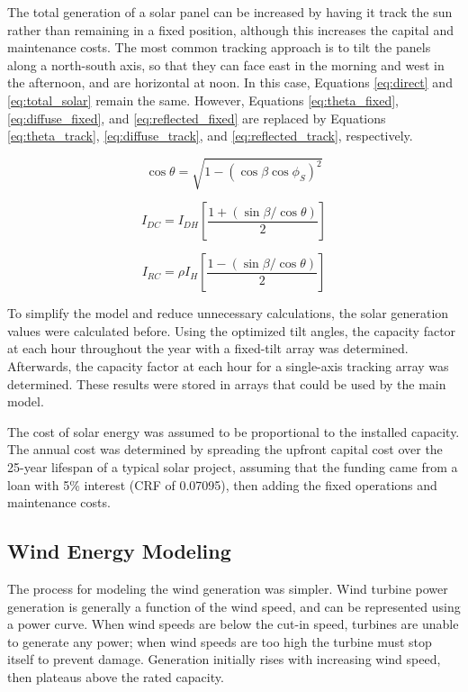 \documentclass{article}
\begin{document}
The total generation of a solar panel can be increased by having it track the sun rather than remaining in a fixed position, although this increases the capital and maintenance costs.  The most common tracking approach is to tilt the panels along a north-south axis, so that they can face east in the morning and west in the afternoon, and are horizontal at noon.  In this case, Equations \ref{eq:direct} and \ref{eq:total_solar} remain the same.  However, Equations \ref{eq:theta_fixed}, \ref{eq:diffuse_fixed}, and \ref{eq:reflected_fixed} are replaced by Equations \ref{eq:theta_track}, \ref{eq:diffuse_track}, and \ref{eq:reflected_track}, respectively.

\begin{equation}
\cos \theta = \sqrt{1 - \left(\cos\beta\cos\phi_S \right)^2}
\label{eq:theta_track}
\end{equation}

\begin{equation}
I_{\mathit{DC}} = I_{\mathit{DH}} \left[\frac{1 + \left(\sin \beta / \cos \theta\right)}{2}\right]
\label{eq:diffuse_track}
\end{equation}

\begin{equation}
I_{\mathit{RC}} = \rho I_H \left[\frac{1 - \left(\sin \beta / \cos \theta\right)}{2}\right]
\label{eq:reflected_track}
\end{equation}

To simplify the model and reduce unnecessary calculations, the solar generation values were calculated before.  Using the optimized tilt angles, the capacity factor at each hour throughout the year with a fixed-tilt array was determined.  Afterwards, the capacity factor at each hour for a single-axis tracking array was determined.  These results were stored in arrays that could be used by the main model.

The cost of solar energy was assumed to be proportional to the installed capacity.  The annual cost  was determined by spreading the upfront capital cost over the 25-year lifespan of a typical solar project, assuming that the funding came from a loan with 5\% interest (CRF of 0.07095), then adding the fixed operations and maintenance costs.  

\subsection{Wind Energy Modeling}

The process for modeling the wind generation was simpler.  Wind turbine power generation is generally a function of the wind speed, and can be represented using a power curve.  When wind speeds are below the cut-in speed, turbines are unable to generate any power; when wind speeds are too high the turbine must stop itself to prevent damage.  Generation initially rises with increasing wind speed, then plateaus above the rated capacity.
\end{document}
